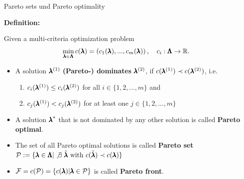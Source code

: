 \begin{frame}{Pareto sets und Pareto optimality}

\textbf{Definition:}

Given a multi-criteria optimization problem
    $$\min_{\pmb{\lambda} \in \pmb{\Lambda}} c(\pmb{\lambda}) = \left(c_1(\pmb{\lambda}), ..., c_m(\pmb{\lambda})\right), \quad c_i: \pmb{\Lambda} \to \mathbb{R}.$$

\begin{itemize}
    \item A solution $\pmb{\lambda}^{(1)}$ \textbf{(Pareto-) dominates} $\pmb{\lambda}^{(2)}$, if $c(\pmb{\lambda}^{(1)}) \prec c(\pmb{\lambda}^{(2)})$, i.e.
\begin{enumerate}
    \item $c_i(\pmb{\lambda}^{(1)}) \le c_i(\pmb{\lambda}^{(2)})$ for all $i \in \{1, 2, ..., m\}$ and
    \item $c_j(\pmb{\lambda}^{(1)}) < c_j(\pmb{\lambda}^{(2)})$ for at least one $j \in \{1, 2, ..., m\}$
\end{enumerate}
\vspace*{0.1cm}
\item A solution ${\pmb{\lambda}}^*$ that is not dominated by any other solution is called \textbf{Pareto optimal}.
\vspace*{0.1cm}
\item The set of all Pareto optimal solutions is called \textbf{Pareto set} $\mathcal{P} := \{\pmb{\lambda} \in \pmb{\Lambda} |\not \exists ~\tilde{\pmb{\lambda}} \text{ with } c(\tilde{\pmb{\lambda}}) \prec c(\pmb{\lambda})\}$
\item $\mathcal{F} = c(\mathcal{P}) = \{c(\pmb{\lambda}) | \pmb{\lambda} \in \mathcal{P}\}$ is called \textbf{Pareto front}.
\end{itemize}

\end{frame}


